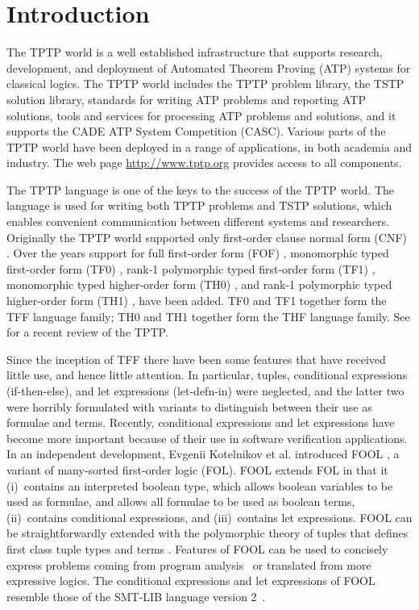 
\section{Introduction}
\label{sec:tfx/Introduction}

The TPTP world \cite{Sut10} is a well established infrastructure that supports
research, development, and deployment of Automated Theorem Proving (ATP)
systems for classical logics.
The TPTP world includes the TPTP problem library,
the TSTP solution library,
standards for writing ATP problems and reporting ATP solutions,
tools and services for processing ATP problems and solutions,
and it supports the CADE ATP System Competition (CASC).
Various parts of the TPTP world have been deployed in a range of applications,
in both academia and industry.
The web page \url{http://www.tptp.org} provides access to all components.

The TPTP language is one of the keys to the success of the TPTP world.
The language is used for writing both TPTP problems and TSTP solutions,
which enables convenient communication between different systems and
researchers.
Originally the TPTP world supported only first-order clause normal form (CNF)
\cite{SS98-JAR}.
Over the years support for full first-order form (FOF) \cite{Sut09},
monomorphic typed first-order form (TF0) \cite{tff0}, rank-1 polymorphic
typed first-order form (TF1) \cite{tff1}, monomorphic typed higher-order 
form (TH0) \cite{THF}, and rank-1 polymorphic typed higher-order form (TH1) 
\cite{KSR16}, have been added.
TF0 and TF1 together form the TFF language family; TH0 and TH1 together form 
the THF language family.
See \cite{Sut17} for a recent review of the TPTP.

Since the inception of TFF there have been some features that have 
received little use, and hence little attention. 
In particular, tuples, conditional expressions (if-then-else), and let 
expressions (let-defn-in) were neglected, and the latter two were horribly 
formulated with variants to distinguish between their use as formulae and 
terms. 
Recently, conditional expressions and let expressions have become more 
important because of their use in software verification applications.
In an independent development, Evgenii Kotelnikov et al. introduced FOOL
\cite{FOOL}, a variant of many-sorted first-order logic (FOL).
FOOL extends FOL in that it (i)~contains an interpreted boolean type, which
allows boolean variables to be used as formulae, and allows all formulae to be 
used as boolean terms, (ii)~contains conditional expressions, and 
(iii)~contains let expressions.
FOOL can be straightforwardly extended with the polymorphic theory of tuples 
that defines first class tuple types and terms \cite{KKV18}.
Features of FOOL can be used to concisely express problems coming from program
analysis~\cite{KKV18} or translated from more expressive logics. 
The conditional expressions and let expressions of FOOL resemble those of the 
SMT-LIB language version 2~\cite{SMT-LIB}.

